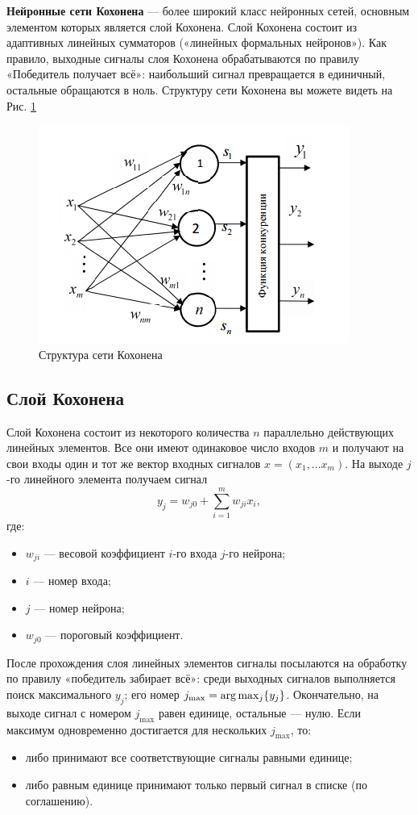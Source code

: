 \documentclass[a4paper,12pt]{article}
\begin{document}
\textbf{Нейронные сети Кохонена} — более широкий класс нейронных сетей, основным элементом которых является слой Кохонена. Слой Кохонена состоит из адаптивных линейных сумматоров («линейных формальных нейронов»). Как правило, выходные сигналы слоя Кохонена обрабатываются по правилу «Победитель получает всё»: наибольший сигнал превращается в единичный, остальные обращаются в ноль. Структуру сети Кохонена вы можете видеть на Рис. \ref{img:network}

\begin{figure}[h]
  \centering
  \includegraphics{network.png}
  \caption{Структура сети Кохонена}
  \label{img:network}
\end{figure}

\subsection{Слой Кохонена}

Слой Кохонена состоит из некоторого количества $n$ параллельно действующих линейных элементов. Все они имеют одинаковое число входов $m$ и получают на свои входы один и тот же вектор входных сигналов $x=(x_{1},...x_{m})$. На выходе $j$-го линейного элемента получаем сигнал 
\[
  y_{j}=w_{{j0}}+\sum _{{i=1}}^{m}w_{{ji}}x_{i},
\]
где:
\begin{itemize}
  \setlength\itemsep{0em}
  \item $w_{{ji}}$ — весовой коэффициент $i$-го входа $j$-го нейрона;
  \item $i$ — номер входа;
  \item $j$ — номер нейрона;
  \item $w_{{j0}}$ — пороговый коэффициент.
\end{itemize}

После прохождения слоя линейных элементов сигналы посылаются на обработку по правилу «победитель забирает всё»: среди выходных сигналов выполняется поиск максимального \(y_{j}\); его номер \(j_{{\max }}={{\rm {arg}}}\max _{{j}}\{y_{j}\}\). Окончательно, на выходе сигнал с номером \(j_{{\max }}\) равен единице, остальные — нулю. Если максимум одновременно достигается для нескольких \(j_{{\max }}\), то:
\begin{itemize}
  \setlength\itemsep{0em}
  \item либо принимают все соответствующие сигналы равными единице;
  \item либо равным единице принимают только первый сигнал в списке (по соглашению).
\end{itemize}
\end{document}
